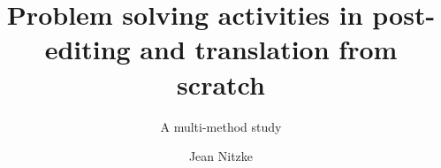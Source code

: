 \author{Jean Nitzke}
\title{Problem solving activities in post-editing and translation from scratch}
\subtitle{A multi-method study}
\renewcommand{\lsSeries}{tmnlp}
\renewcommand{\lsSeriesNumber}{}
